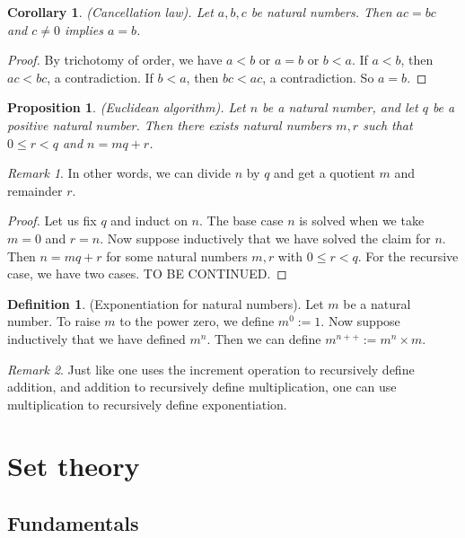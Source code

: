 \documentclass[12pt]{article}
\newtheorem{corollary}[theorem]{Corollary}
\newtheorem{proposition}[theorem]{Proposition}
\theoremstyle{definition}
\newtheorem{definition}[theorem]{Definition}
\theoremstyle{remark}
\newtheorem*{remark}{Remark}
\begin{document}
\begin{corollary}
    (Cancellation law). Let $a,b,c$ be natural numbers. Then $ac = bc$ and $c \neq 0$ implies $a = b$.
\end{corollary}

\begin{proof}
    By trichotomy of order, we have $a < b$ or $a = b$ or $b < a$. If $a < b$, then $ac < bc$, a contradiction. If $b < a$, then $bc < ac$, a contradiction. So $a = b$.
\end{proof}

\begin{proposition}
    (Euclidean algorithm). Let $n$ be a natural number, and let $q$ be a positive natural number. Then there exists natural numbers $m,r$ such that $0 \leq r < q$ and $n = mq + r$.
\end{proposition}

\begin{remark}
    In other words, we can divide $n$ by $q$ and get a quotient $m$ and remainder $r$.
\end{remark}

\begin{proof}
    Let us fix $q$ and induct on $n$. The base case $n$ is solved when we take $m = 0$ and $r = n$. Now suppose inductively that we have solved the claim for $n$. Then $n = mq + r$ for some natural numbers $m,r$ with $0 \leq r < q$. For the recursive case, we have two cases. TO BE CONTINUED. 
\end{proof}

\begin{definition}
    (Exponentiation for natural numbers). Let $m$ be a natural number. To raise $m$ to the power zero, we define $m^0 := 1$. Now suppose inductively that we have defined $m^n$. Then we can define $m^{n++} := m^n \times m$.
\end{definition}

\begin{remark}
    Just like one uses the increment operation to recursively define addition, and addition to recursively define multiplication, one can use multiplication to recursively define exponentiation.
\end{remark}

\section{Set theory}

\subsection{Fundamentals}
\end{document}

